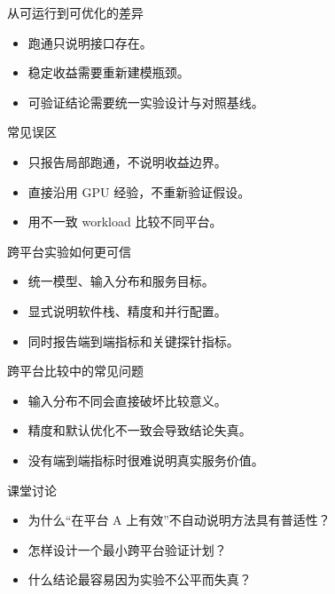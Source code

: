 \begin{frame}{从可运行到可优化的差异}
  \begin{itemize}
    \item 跑通只说明接口存在。
    \item 稳定收益需要重新建模瓶颈。
    \item 可验证结论需要统一实验设计与对照基线。
  \end{itemize}
\end{frame}

\begin{frame}{常见误区}
  \begin{itemize}
    \item 只报告局部跑通，不说明收益边界。
    \item 直接沿用 GPU 经验，不重新验证假设。
    \item 用不一致 workload 比较不同平台。
  \end{itemize}
\end{frame}

\begin{frame}{跨平台实验如何更可信}
  \begin{itemize}
    \item 统一模型、输入分布和服务目标。
    \item 显式说明软件栈、精度和并行配置。
    \item 同时报告端到端指标和关键探针指标。
  \end{itemize}
\end{frame}

\begin{frame}{跨平台比较中的常见问题}
  \begin{itemize}
    \item 输入分布不同会直接破坏比较意义。
    \item 精度和默认优化不一致会导致结论失真。
    \item 没有端到端指标时很难说明真实服务价值。
  \end{itemize}
\end{frame}



\begin{frame}{课堂讨论}
  \begin{itemize}
    \item 为什么“在平台 A 上有效”不自动说明方法具有普适性？
    \item 怎样设计一个最小跨平台验证计划？
    \item 什么结论最容易因为实验不公平而失真？
  \end{itemize}
\end{frame}

